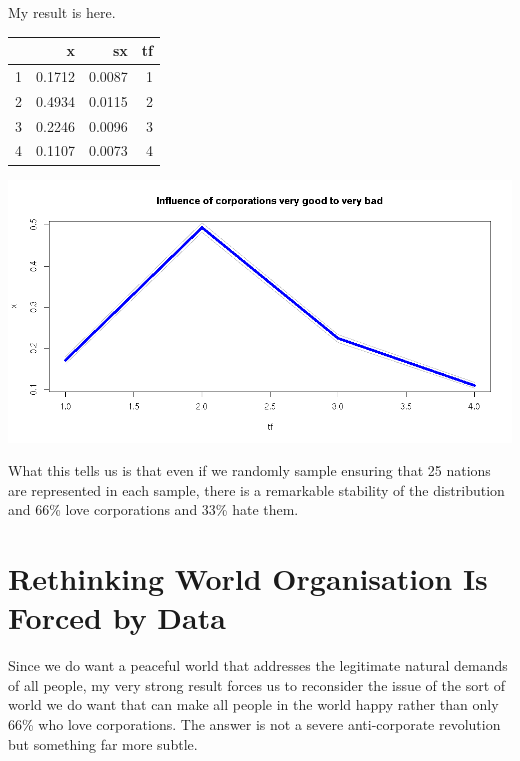 \documentclass{amsart}
\begin{document}
My result is here.

\begin{table}[ht]
\centering
\begin{tabular}{rrrr}
  \hline
 & x & sx & tf \\ 
  \hline
1 & 0.1712 & 0.0087 &  1 \\ 
  2 & 0.4934 & 0.0115 &  2 \\ 
  3 & 0.2246 & 0.0096 &  3 \\ 
  4 & 0.1107 & 0.0073 &  4 \\ 
   \hline
\end{tabular}
\end{table}

\includegraphics[scale=0.5]{corpop.png}

What this tells us is that even if we randomly sample ensuring that 25 nations are represented in each sample, there is a remarkable stability of the distribution and 66\% love corporations and 33\% hate them.

\section{Rethinking World Organisation Is Forced by Data}

Since we do want a peaceful world that addresses the legitimate natural demands of all people, my very strong result forces us to reconsider the issue of the sort of world we do want that can make all people in the world happy rather than only 66\% who love corporations.  The answer is not a severe anti-corporate revolution but something far more subtle.
\end{document}
